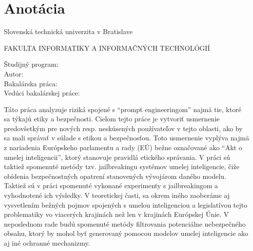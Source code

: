 \thispagestyle{empty}

\section*{Anotácia}

\begin{minipage}[t]{1\columnwidth}%
Slovenská technická univerzita v Bratislave

FAKULTA INFORMATIKY A INFORMAČNÝCH TECHNOLÓGIÍ

Študijný program: \hspace{1.4cm} \myStudyProgramSK\\

\noindent
Autor: \hspace{3.5cm} \myName \\
Bakalárska práca: \hspace{1.5cm} \myTitleSK \\
Vedúci bakalárskej práce: \hspace{0.12cm} \mySupervisor \\
\noindent
\myDateSK%
\end{minipage}

\bigskip{}

Táto práca analyzuje riziká spojené s ``prompt engineeringom'' najmä tie, ktoré sa týkajú etiky a bezpečnosti. Cielom tejto práce je vytvoriť usmernenie predovšetkým pre nových resp. neskúsených používateľov v tejto oblasti, ako by sa mali správať v súlade s etikou a bezpečnosťou. Toto usmernenie vyplýva najmä z nariadenia Európskeho parlamentu a rady (EÚ) bežne označované ako ``Akt o umelej inteligencii'', ktorý stanovuje pravidlá etického správania. V práci sú taktiež spomenuté metódy tzv. jailbreakingu systémov umelej inteligencie, čiže obídenia bezpečnostných opatrení stanovených vývojárom daného modelu. Taktiež sú v práci spomenuté vykonané experimenty s jailbreakingom a vyhodnotené ich výsledky. V teoretickej časti, sa okrem iného zaoberáme aj vysvetlením bežných pojmov spojených s umelou inteligenciou a legislatívou tejto problematiky vo viacerých krajinách než len v krajinách Európskej Únie. V neposlednom rade budú spomenuté metódy filtrovania potenciálne nebezpečného obsahu, ktorý by mohol byť generovaný pomocou modelov umelej inteligencie ako aj iné ochranné mechanizmy.


\newpage{}\thispagestyle{empty}

\newpage
\thispagestyle{empty}
\mbox{}
\newpage

